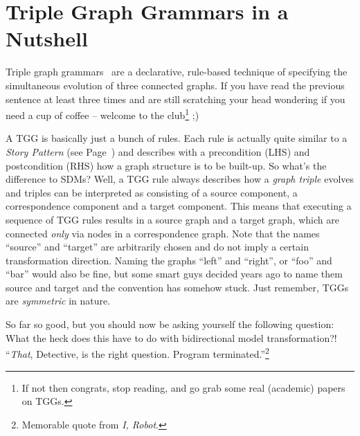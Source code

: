 \section{Triple Graph Grammars in a Nutshell}

Triple graph grammars~\cite{tgg:schuerr_94,sk2008,Klar2010} are a declarative, rule-based technique of specifying the simultaneous evolution of three connected graphs.
If you have read the previous sentence at least three times and are still scratching your head wondering if you need a cup of coffee -- welcome to the club\footnote{If not then congrats, stop reading, and go grab some real (academic) papers on TGGs.} ;)

A TGG is basically just a bunch of rules.
Each rule is actually quite similar to a \emph{Story Pattern} (see Page~\pageref{story-pattern}) and describes with a precondition (LHS) and postcondition (RHS) how a graph structure is to be built-up.
So what's the difference to SDMs?  
Well, a TGG rule always describes how a \emph{graph triple} evolves and triples can be interpreted as consisting of a source component, a correspondence component and a target component.
This means that executing a sequence of TGG rules results in a source graph and a target graph, which are connected \emph{only} via nodes in a correspondence graph.
Note that the names ``source'' and ``target'' are arbitrarily chosen and do not imply a certain transformation direction.
Naming the graphs ``left'' and ``right'', or ``foo'' and ``bar'' would also be fine, but some smart guys decided years ago to name them source and target and the convention has somehow stuck.
Just remember, TGGs are \emph{symmetric} in nature. 

So far so good, but you should now be asking yourself the following question: What the {\huge heck} does this have to do with bidirectional model transformation?!  ``\emph{That}, Detective, is the right question. Program terminated.''\footnote{Memorable quote from \emph{I, Robot}.}

